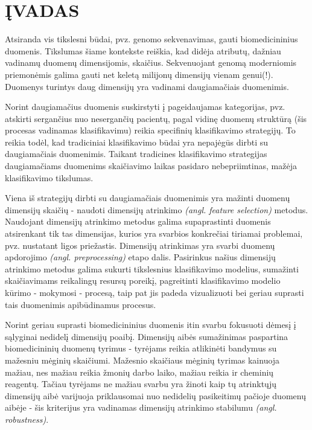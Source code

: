 \newpage
\section*{ĮVADAS}

Atsiranda vis tikslesni būdai, pvz. genomo sekvenavimas, gauti 
biomedicininius duomenis. Tikslumas šiame kontekste reiškia, kad didėja 
atributų, dažniau
vadinamų duomenų dimensijomis, skaičius. Sekvenuojant genomą moderniomis 
priemonėmis galima gauti net keletą milijonų dimensijų vienam genui(!).
Duomenys turintys daug dimensijų yra vadinami daugiamačiais duomenimis.

Norint daugiamačius duomenis suskirstyti į pageidaujamas kategorijas, pvz. 
atskirti sergančius nuo nesergančių pacientų, pagal vidinę duomenų struktūrą 
(šis procesas vadinamas klasifikavimu) reikia specifinių klasifikavimo 
strategijų. To reikia todėl,
kad tradiciniai klasifikavimo būdai yra nepajėgūs dirbti su daugiamačiais
duomenimis. Taikant tradicines klasifikavimo strategijas daugiamačiams 
duomenims skaičiavimo laikas pasidaro nebepriimtinas, mažėja klasifikavimo
tikslumas. 
 
Viena iš strategijų dirbti su daugiamačiais duomenimis yra mažinti duomenų 
dimensijų skaičių - naudoti dimensijų atrinkimo \textit{(angl. feature
selection)}  metodus. Naudojant dimensijų atrinkimo metodus galima 
supaprastinti duomenis atsirenkant tik tas dimensijas, kurios yra svarbios 
konkrečiai tiriamai problemai, pvz. nustatant ligos priežastis. Dimensijų 
atrinkimas yra svarbi duomenų apdorojimo \textit{(angl. preprocessing)} etapo
dalis. Pasirinkus našius dimensijų atrinkimo metodus galima sukurti tikslesnius
klasifikavimo modelius, sumažinti skaičiavimams reikalingų resursų poreikį,
pagreitinti klasifikavimo modelio kūrimo - mokymosi - procesą, taip pat jis 
padeda vizualizuoti bei geriau suprasti tais duomenimis apibūdinamus procesus.

Norint geriau suprasti biomedicininius duomenis itin svarbu fokusuoti dėmesį į 
sąlyginai nedidelį dimensijų poaibį. Dimensijų aibės sumažinimas paspartina
biomedicininių duomenų tyrimus - tyrėjams reikia atlikinėti bandymus su 
mažesniu mėginių skaičiumi. Mažesnio skaičiaus mėginių tyrimas kainuoja mažiau,
nes mažiau reikia žmonių darbo laiko, mažiau reikia ir cheminių reagentų. 
Tačiau tyrėjams ne mažiau svarbu yra žinoti kaip tų atrinktųjų dimensijų aibė varijuoja 
priklausomai nuo nedidelių pasikeitimų pačioje duomenų aibėje - šis kriterijus 
yra vadinamas dimensijų atrinkimo stabilumu \textit{(angl. robustness)}. 

